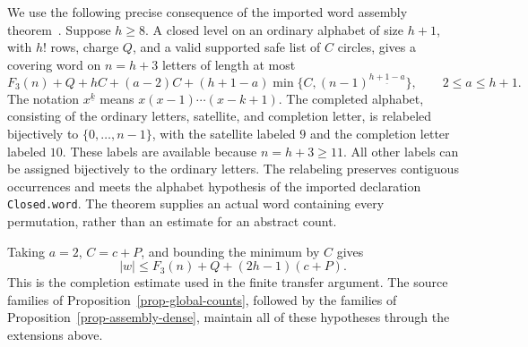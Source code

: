 We use the following precise consequence of the imported word assembly
theorem~\cite{halfar-assembly}. Suppose $h\ge8$. A closed level on an ordinary alphabet
of size $h+1$, with $h!$ rows, charge $Q$, and a valid supported safe
list of $C$ circles, gives a covering word on $n=h+3$ letters of length
at most
\[
 F_3(n)+Q+hC+(a-2)C
 +(h+1-a)\min\{C,(n-1)^{\underline{h+1-a}}\},
 \qquad 2\le a\le h+1.
\]
The notation $x^{\underline{k}}$ means $x(x-1)\cdots(x-k+1)$.
The completed alphabet, consisting of the ordinary letters, satellite,
and completion letter, is relabeled bijectively to $\{0,\ldots,n-1\}$,
with the satellite labeled $9$ and the completion letter labeled $10$.
These labels are available because $n=h+3\ge11$. All other labels can
be assigned bijectively to the ordinary letters. The relabeling preserves
contiguous occurrences and meets the alphabet hypothesis of the imported
declaration \texttt{Closed.word}. The theorem supplies
an actual word containing every permutation, rather than an estimate
for an abstract count.

Taking $a=2$, $C=c+P$, and bounding the minimum by $C$ gives
\begin{equation}
 |w|\le F_3(n)+Q+(2h-1)(c+P).
 \label{eq-assembly-word}
\end{equation}
This is the completion estimate used in the finite transfer argument.
The source families of Proposition~\ref{prop-global-counts}, followed by
the families of Proposition~\ref{prop-assembly-dense}, maintain all of
these hypotheses through the extensions above.

